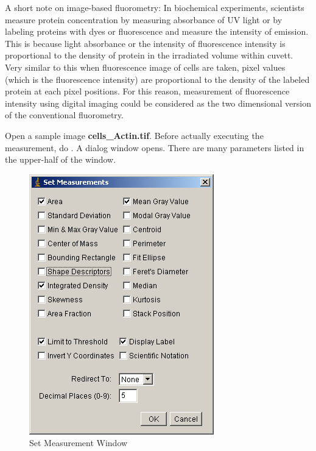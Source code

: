 A short note on image-based fluorometry: In biochemical experiments,
scientists measure protein concentration by measuring absorbance of UV
light or by labeling proteins with dyes or fluorescence and measure the
intensity of emission. This is because light absorbance or the
intensity of fluorescence intensity is proportional to the density of
protein in the irradiated volume within cuvett. Very similar to this
when fluorescence image of cells are taken, pixel values (which is the
fluorescence intensity) are proportional to the density of the labeled
protein at each pixel positions. For this reason, measurement of
fluorescence intensity using digital imaging could be considered as the
two dimensional version of the conventional fluorometry. 

\begin{indentexercise}{1}
\item Open a sample image \textbf{cells\_Actin.tif}. Before actually executing the measurement,
do . A dialog
window opens. There are many parameters listed in the upper-half of the
window.

\begin{figure}[htbp]
\begin{center}
\includegraphics[width=8.017cm,height=11.298cm]{img/CMCIBasicCourse201102-img32.png}
\caption{Set Measurement Window}
\label{fig:img32}
\end{center}
\end{figure}



\end{indentexercise}
